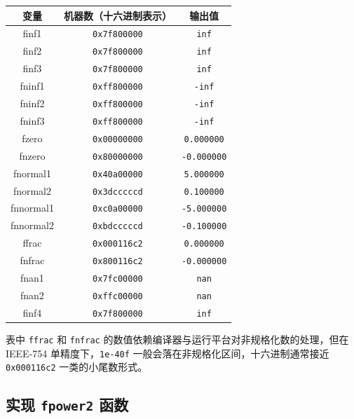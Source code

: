 \documentclass[12pt, a4paper]{academics}
\begin{document}
\begin{center}
\begin{tabular}{|c|c|c|}
\hline
变量 & 机器数（十六进制表示） & 输出值 \\
\hline
finf1 & \texttt{0x7f800000} & \texttt{inf} \\
\hline
finf2 & \texttt{0x7f800000} & \texttt{inf} \\
\hline
finf3 & \texttt{0x7f800000} & \texttt{inf} \\
\hline
fninf1 & \texttt{0xff800000} & \texttt{-inf} \\
\hline
fninf2 & \texttt{0xff800000} & \texttt{-inf} \\
\hline
fninf3 & \texttt{0xff800000} & \texttt{-inf} \\
\hline
fzero & \texttt{0x00000000} & \texttt{0.000000} \\
\hline
fnzero & \texttt{0x80000000} & \texttt{-0.000000} \\
\hline
fnormal1 & \texttt{0x40a00000} & \texttt{5.000000} \\
\hline
fnormal2 & \texttt{0x3dcccccd} & \texttt{0.100000} \\
\hline
fnnormal1 & \texttt{0xc0a00000} & \texttt{-5.000000} \\
\hline
fnnormal2 & \texttt{0xbdcccccd} & \texttt{-0.100000} \\
\hline
ffrac & \texttt{0x000116c2} & \texttt{0.000000} \\
\hline
fnfrac & \texttt{0x800116c2} & \texttt{-0.000000} \\
\hline
fnan1 & \texttt{0x7fc00000} & \texttt{nan} \\
\hline
fnan2 & \texttt{0xffc00000} & \texttt{nan} \\
\hline
finf4 & \texttt{0x7f800000} & \texttt{inf} \\
\hline
\end{tabular}
\end{center}

表中 \texttt{ffrac} 和 \texttt{fnfrac} 的数值依赖编译器与运行平台对非规格化数的处理，但在 IEEE-754 单精度下，\texttt{1e-40f} 一般会落在非规格化区间，十六进制通常接近 \texttt{0x000116c2} 一类的小尾数形式。

\subsection{实现 \texttt{fpower2} 函数}
\end{document}
